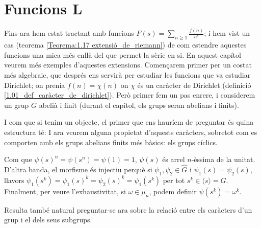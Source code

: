 \chapter{Funcions L}
Fins ara hem estat tractant amb funcions $F(s)=\sum_{n\geq1}\frac{f(n)}{n^s}$; i hem vist un cas (teorema \ref{Teorema:1.17 extensió_de_riemann}) de com
estendre aquestes funcions una mica més enllà del que permet la sèrie en si. En aquest capítol veurem més exemples d'aquestes extensions. Començarem 
primer per un costat més algebraic, que després ens servirà per estudiar les funcions que va estudiar Dirichlet; on prenia $f(n)=\chi(n)$ on $\chi$ és
un caràcter de Dirichlet (definició \ref{1.01_def_caràcter_de_dirichlet}). Però primer fem un pas enrere, i considerem un grup $G$ abelià i finit
(durant el capítol, els grups seran abelians i finits).


I com que si tenim un objecte, el primer que ens hauríem de preguntar és quina estructura té:
I ara veurem alguna propietat d'aquests caràcters, sobretot com es comporten amb els grups abelians finits més bàsics: els grups cíclics.
\begin{pf}
    Com que $\psi(s)^n = \psi(s^n) = \psi(1) = 1$, $\psi(s)$ és arrel $n$-èssima de la unitat. D'altra banda, el morfisme és injectiu perquè si $\psi_1, \psi_2 \in \widehat{G}$ i $\psi_1(s) = \psi_2(s)$, llavors $\psi_1(s^k) = \psi_1(s)^k = \psi_2(s)^k = \psi_1(s^k)$ per tot $s^k \in \langle s \rangle = G$. Finalment, per veure l'exhaustivitat, si $\omega \in \mu_n$, podem definir $\psi(s^k) = \omega^k$.
\end{pf}
Resulta també natural preguntar-se ara sobre la relació entre els caràcters d'un grup i el dels seus subgrups. 

